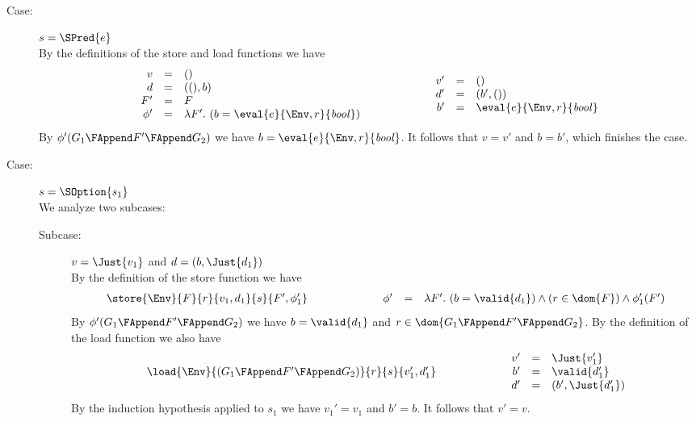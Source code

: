 {\begin{description}
\item[Case:] $s = \SPred{e}$\\[1ex]
%
By the definitions of the store and load functions we have
\[
\begin{array}{rcl}
v &=& ()\\
d &=& ((),b)\\
F' &=& F\\
\phi' &=& \lambda F'.~(b = \eval{e}{\Env,r}{\mathit{bool}})\\
\end{array}\hspace*{2cm}\begin{array}{rcl}
v' &=& ()\\
d' &=& (b',())\\
b' &=& \eval{e}{\Env,r}{\mathit{bool}}\\
\end{array}
\]
By $\phi'(G_1 \FAppend F' \FAppend G_2)$ we have $b =
\eval{e}{\Env,r}{\mathit{bool}}$. It follows that $v = v'$ and $b =
b'$, which finishes the case.

\item[Case:] $s = \SOption{s_1}$\\[1ex]
%
We analyze two subcases:
\begin{description}
\item[Subcase:] $v = \Just{v_1}$ and $d = (b,\Just{d_1})$\\[1ex]
%
By the definition of the store function we have
\[
\begin{array}{l}
\store{\Env}{F}{r}{ v_1,d_1 }{s}{F',\phi_1'}\\
\end{array}\hspace*{2cm}\begin{array}{rcl}
\phi' &=& \lambda F'.~(b = \valid{d_1}) \wedge (r \in \dom{F}) \wedge \phi_1'(F')\\
\end{array}
\]
%
By $\phi'(G_1 \FAppend F' \FAppend G_2)$ we have $b = \valid{d_1}$ and
$r \in \dom{G_1 \FAppend F' \FAppend G_2}$.  By the definition of the
load function we also have
\[ 
\begin{array}{rcll}
\load{\Env}{(G_1 \FAppend F' \FAppend G_2)}{r}{s}{v_1',d_1'}\\
\end{array}\hspace*{2cm}\begin{array}{rcl}
v' &=& \Just{v_1'}\\
b' &=& \valid{d_1'}\\
d' &=& (b',\Just{d_1'})\\
\end{array}
\]
By the induction hypothesis applied to $s_1$ we have $v_1' = v_1$ and
$b' = b$. It follows that $v' = v$.


\end{description}
\end{description}}
